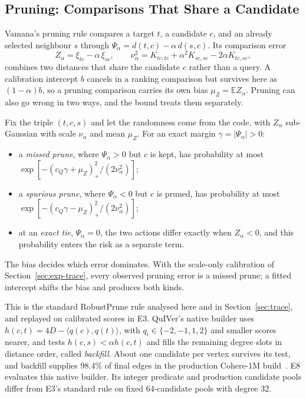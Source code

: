 \documentclass[twoside,11pt]{article}
\newcommand{\E}{\mathbb{E}}
\begin{document}
\subsection{Pruning: Comparisons That Share a Candidate}
\label{sec:pruning}

Vamana's pruning rule compares a target $t$, a candidate $c$, and an already selected neighbour $s$ through $\Psi_\alpha=d(t,c)-\alpha\,d(s,c)$. Its comparison error
\begin{equation}
Z_\alpha=\xi_{tc}-\alpha\,\xi_{sc},\qquad
\nu_\alpha^2=K_{tc,tc}+\alpha^2K_{sc,sc}-2\alpha K_{tc,sc},
\end{equation}
combines two distances that share the candidate $c$ rather than a query. A calibration intercept $b$ cancels in a ranking comparison but survives here as $(1-\alpha)b$, so a pruning comparison carries its own bias $\mu_Z=\E Z_\alpha$. Pruning can also go wrong in two ways, and the bound treats them separately.

\begin{proposition}
\label{prop:pruning}
Fix the triple $(t,c,s)$ and let the randomness come from the code, with $Z_\alpha$ sub-Gaussian with scale $\nu_\alpha$ and mean $\mu_Z$. For an exact margin $\gamma=|\Psi_\alpha|>0$:
\begin{itemize}
\setlength{\itemsep}{2pt}
\setlength{\parsep}{0pt}
\item a \emph{missed prune}, where $\Psi_\alpha>0$ but $c$ is kept, has probability at most $\exp[-(c_Q\gamma+\mu_Z)_+^2/(2\nu_\alpha^2)]$;
\item a \emph{spurious prune}, where $\Psi_\alpha<0$ but $c$ is pruned, has probability at most $\exp[-(c_Q\gamma-\mu_Z)_+^2/(2\nu_\alpha^2)]$;
\item at an \emph{exact tie}, $\Psi_\alpha=0$, the two actions differ exactly when $Z_\alpha<0$, and this probability enters the risk as a separate term.
\end{itemize}
\end{proposition}

The bias decides which error dominates. With the scale-only calibration of Section~\ref{sec:exp-trace}, every observed pruning error is a missed prune; a fitted intercept shifts the bias and produces both kinds.

This is the standard RobustPrune rule analysed here and in Section~\ref{sec:trace}, and replayed on calibrated scores in E3. QuIVer's native builder uses $h(c,t)=4D-\langle q(c),q(t)\rangle$, with $q_i\in\{-2,-1,1,2\}$ and smaller scores nearer, and tests $h(c,s)<\alpha h(c,t)$ and fills the remaining degree slots in distance order, called \emph{backfill}. About one candidate per vertex survives its test, and backfill supplies 98.4\% of final edges in the production Cohere-1M build~\citep{xiao2026quiver}. E8 evaluates this native builder. Its integer predicate and production candidate pools differ from E3's standard rule on fixed 64-candidate pools with degree 32.
\end{document}
